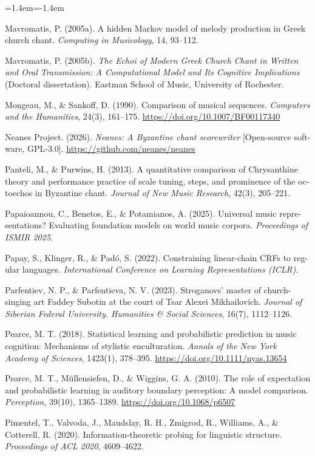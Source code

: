 \documentclass[11pt,a4paper]{article}
\newenvironment{reflist}{\begin{list}{}{\leftmargin=1.4em\itemindent=-1.4em\itemsep=0.8pt\parsep=0pt}\small}{\end{list}}
\begin{document}
\begin{otherlanguage}{english}
\begin{reflist}
\item Mavromatis, P. (2005a). A hidden Markov model of melody production in Greek church chant. \emph{Computing in Musicology}, 14, 93--112.
\item Mavromatis, P. (2005b). \emph{The Echoi of Modern Greek Church Chant in Written and Oral Transmission: A Computational Model and Its Cognitive Implications} (Doctoral dissertation). Eastman School of Music, University of Rochester.
\item Mongeau, M., \& Sankoff, D. (1990). Comparison of musical sequences. \emph{Computers and the Humanities}, 24(3), 161--175. \url{https://doi.org/10.1007/BF00117340}
\item Neanes Project. (2026). \emph{Neanes: A Byzantine chant scorewriter} [Open-source software, GPL-3.0]. \url{https://github.com/neanes/neanes}
\item Panteli, M., \& Purwins, H. (2013). A quantitative comparison of Chrysanthine theory and performance practice of scale tuning, steps, and prominence of the octoechos in Byzantine chant. \emph{Journal of New Music Research}, 42(3), 205--221.
\item Papaioannou, C., Benetos, E., \& Potamianos, A. (2025). Universal music representations? Evaluating foundation models on world music corpora. \emph{Proceedings of ISMIR 2025}.
\item Papay, S., Klinger, R., \& Padó, S. (2022). Constraining linear-chain CRFs to regular languages. \emph{International Conference on Learning Representations (ICLR)}.
\item Parfentiev, N. P., \& Parfentieva, N. V. (2023). Stroganovs' master of church-singing art Faddey Subotin at the court of Tsar Alexei Mikhailovich. \emph{Journal of Siberian Federal University. Humanities \& Social Sciences}, 16(7), 1112--1126.
\item Pearce, M. T. (2018). Statistical learning and probabilistic prediction in music cognition: Mechanisms of stylistic enculturation. \emph{Annals of the New York Academy of Sciences}, 1423(1), 378--395. \url{https://doi.org/10.1111/nyas.13654}
\item Pearce, M. T., Müllensiefen, D., \& Wiggins, G. A. (2010). The role of expectation and probabilistic learning in auditory boundary perception: A model comparison. \emph{Perception}, 39(10), 1365--1389. \url{https://doi.org/10.1068/p6507}
\item Pimentel, T., Valvoda, J., Maudslay, R. H., Zmigrod, R., Williams, A., \& Cotterell, R. (2020). Information-theoretic probing for linguistic structure. \emph{Proceedings of ACL 2020}, 4609--4622.

\end{reflist}
\end{otherlanguage}
\end{document}
